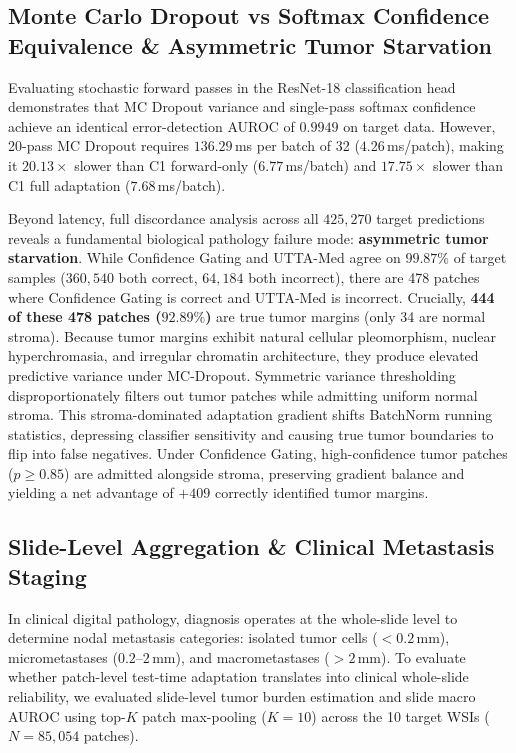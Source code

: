 \documentclass[conference]{IEEEtran}
\begin{document}
\subsection{Monte Carlo Dropout vs Softmax Confidence Equivalence \& Asymmetric Tumor Starvation}
Evaluating stochastic forward passes in the ResNet-18 classification head demonstrates that MC Dropout variance and single-pass softmax confidence achieve an identical error-detection AUROC of $0.9949$ on target data. However, 20-pass MC Dropout requires $136.29$\,ms per batch of 32 ($4.26$\,ms/patch), making it $20.13\times$ slower than C1 forward-only ($6.77$\,ms/batch) and $17.75\times$ slower than C1 full adaptation ($7.68$\,ms/batch).

Beyond latency, full discordance analysis across all $425{,}270$ target predictions reveals a fundamental biological pathology failure mode: \textbf{asymmetric tumor starvation}. While Confidence Gating and UTTA-Med agree on $99.87\%$ of target samples ($360{,}540$ both correct, $64{,}184$ both incorrect), there are 478 patches where Confidence Gating is correct and UTTA-Med is incorrect. Crucially, \textbf{444 of these 478 patches ($92.89\%$)} are true tumor margins (only 34 are normal stroma). Because tumor margins exhibit natural cellular pleomorphism, nuclear hyperchromasia, and irregular chromatin architecture, they produce elevated predictive variance under MC-Dropout. Symmetric variance thresholding disproportionately filters out tumor patches while admitting uniform normal stroma. This stroma-dominated adaptation gradient shifts BatchNorm running statistics, depressing classifier sensitivity and causing true tumor boundaries to flip into false negatives. Under Confidence Gating, high-confidence tumor patches ($p \ge 0.85$) are admitted alongside stroma, preserving gradient balance and yielding a net advantage of $+409$ correctly identified tumor margins.

\subsection{Slide-Level Aggregation \& Clinical Metastasis Staging}
In clinical digital pathology, diagnosis operates at the whole-slide level to determine nodal metastasis categories: isolated tumor cells ($<0.2$\,mm), micrometastases ($0.2$--$2$\,mm), and macrometastases ($>2$\,mm). To evaluate whether patch-level test-time adaptation translates into clinical whole-slide reliability, we evaluated slide-level tumor burden estimation and slide macro AUROC using top-$K$ patch max-pooling ($K=10$) across the 10 target WSIs ($N=85{,}054$ patches).
\end{document}
